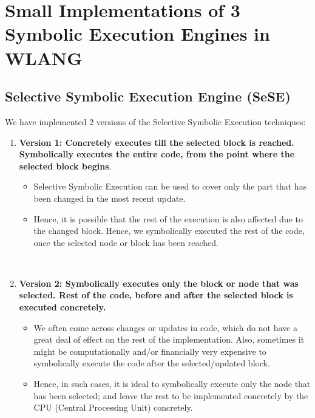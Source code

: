 \documentclass[11pt]{llncs}
\begin{document}
\section{Small Implementations of 3 Symbolic Execution Engines in WLANG}
	\subsection{Selective Symbolic Execution Engine (SeSE)}	 \label{Selective Symbolic Execution Engine (SeSE)}

		We have implemented 2 versions of the Selective Symbolic Execution techniques:
		\begin{enumerate}
			\item \textbf{Version 1: Concretely executes till the selected block is reached. Symbolically executes the entire code, from the point where the selected block begins}.
				\begin{itemize}
					\item Selective Symbolic Execution can be used to cover only the part that has been changed in the most recent update.
					\item Hence, it is possible that the rest of the execution is also affected due to the changed block. Hence, we symbolically executed the rest of the code, once the selected node or block has been reached.
				\end{itemize}


				~\item \textbf{Version 2: Symbolically executes only the block or node that was selected. Rest of the code, before and after the selected block is executed concretely.}
				\begin{itemize}
					\item We often come across changes or updates in code, which do not have a great deal of effect on the rest of the implementation. Also, sometimes it might be computationally and/or financially very expensive to symbolically execute the code after the selected/updated block.
					\item Hence, in such cases, it is ideal to symbolically execute only the node that has been selected; and leave the rest to be implemented concretely by the CPU (Central Processing Unit) concretely.
				\end{itemize}
		\end{enumerate}
\end{document}
